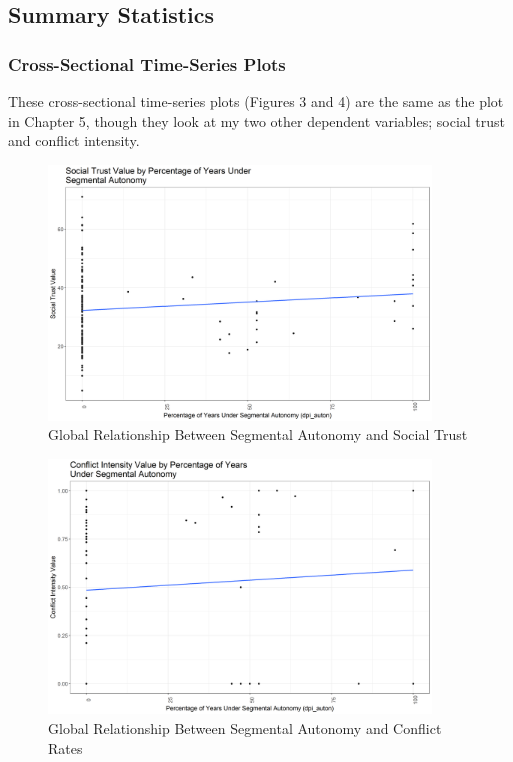 \documentclass[12pt]{article}
\begin{document}
\subsection{Summary Statistics}

\subsubsection{Cross-Sectional Time-Series Plots}

These cross-sectional time-series plots (Figures 3 and 4) are the same as the plot in Chapter 5, though they look at my two other dependent variables; social trust and conflict intensity.

\begin{figure}[!htbp]
	\begin{center}
		\includegraphics[width = 4in]{csts_qog_hum_trust.png}
	\end{center}
	\caption{Global Relationship Between Segmental Autonomy and Social Trust}
\end{figure}

\begin{figure}[!htbp]
	\begin{center}
		\includegraphics[width = 4in]{csts_ucdp_cumulative_intensity.png}
	\end{center}
	\caption{Global Relationship Between Segmental Autonomy and Conflict Rates}
\end{figure}
\end{document}
